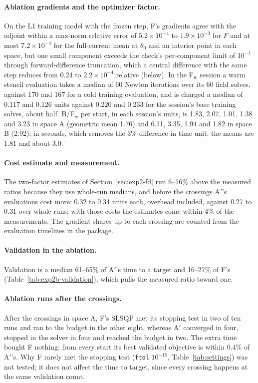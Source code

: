 \documentclass{anvil-paper}
\begin{document}
\paragraph{Ablation gradients and the optimizer factor.}
On the L1 training model with the frozen step, F's gradients agree with the
adjoint within a max-norm relative error of $5.2\times10^{-4}$ to
$1.9\times10^{-3}$ for $F$ and at most $7.2\times10^{-4}$ for the
full-current mean at $\theta_0$ and an interior point in each space, but
one small component exceeds the check's per-component limit of $10^{-1}$
through forward-difference truncation, which a central difference with the
same step reduces from 0.24 to $2.2\times10^{-4}$ relative
(below). In
the F$_w$ session a warm stencil evaluation takes a median of 60 Newton iterations over its 60
field solves, against 170 and 167 for a cold training evaluation, and is
charged a median of 0.117 and
0.126 units against 0.220 and 0.233 for the session's base training solves,
about half. B/F$_w$ per start, in each session's units, is 1.83,
2.07, 1.01, 1.38 and 3.23 in space A (geometric mean 1.76) and 6.11, 3.35,
1.94 and 1.82 in space B (2.92); in seconds, which removes the 3\%
difference in time unit, the means are 1.81 and about 3.0.

\paragraph{Cost estimate and measurement.}
The two-factor estimates of Section~\ref{sec:exp2-fd} run 6--16\% above
the measured ratios because they use whole-run medians, and before the
crossings A$'$'s evaluations cost more: 0.32 to 0.34 units each, overhead
included, against 0.27 to 0.31 over whole runs; with those costs the
estimates come within 4\% of the measurements. The gradient shares up to
each crossing are counted from the evaluation timelines in the package.

\paragraph{Validation in the ablation.}
Validation is a median 61--65\% of A$'$'s time to
a target and 16--27\% of F's (Table~\ref{tab:exp2b-validation}), which
pulls the measured ratio toward one.

\paragraph{Ablation runs after the crossings.}
After the crossings in space A, F's SLSQP met its stopping test in two of ten runs and ran to the
budget in the other eight, whereas A$'$ converged in four, stopped in the
solver in four and reached the budget in two. The extra time bought F
nothing: from every start its best validated objective is within 0.4\% of
A$'$'s. Why F rarely met the stopping test (\texttt{ftol} $10^{-15}$,
Table~\ref{tab:settings}) was not tested; it does not affect the time to
target, since every crossing happens at the same validation count.
\end{document}
